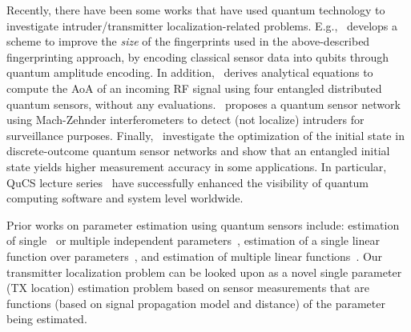 Recently, there have been some works that have used quantum technology to investigate
intruder/transmitter localization-related problems. E.g.,~\cite{lcn22-qloc} develops a scheme
to improve the {\em size} of the fingerprints used in the above-described 
fingerprinting approach, by encoding classical sensor data into qubits 
through quantum amplitude encoding.
In addition,~\cite{PR22-quantum_positioning} derives analytical equations to compute the AoA of an
incoming RF signal using four entangled distributed quantum sensors, without any evaluations.~\cite{qsn-detection} proposes a quantum sensor network 
using Mach-Zehnder interferometers to detect (not localize) 
intruders for surveillance purposes.
Finally,~\cite{Hillery_2023,qsn-acm-24} investigate the optimization of the initial state in discrete-outcome quantum sensor networks and show that an entangled initial state yields
higher measurement accuracy in some applications.
In particular, QuCS lecture series~\cite{zhiding2023} have successfully enhanced the visibility of quantum computing software and system level worldwide.

Prior works on parameter estimation using quantum sensors
include: estimation of single~\cite{Giovannetti_2011} %
or multiple independent parameters~\cite{mpe_2018}, estimation of a single linear function over parameters~\cite{Altenburg_2019}, and estimation of multiple linear functions~\cite{Rubio_2020}. Our transmitter localization problem can be looked upon
as a novel single parameter (TX location) estimation problem based on sensor measurements that are functions (based on signal propagation model and distance) of the parameter being estimated.
